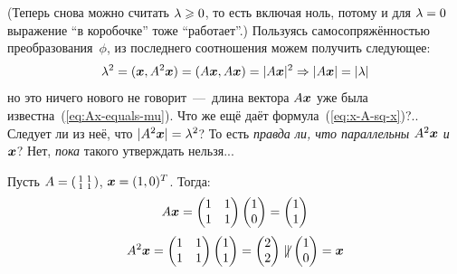\documentclass[a4paper,12pt]{article}
\makeatletter
\newcommand*{\Relbarfill@}{\arrowfill@\Relbar\Relbar\Relbar}
\newcommand*{\xeq}[2][]{\ext@arrow 0055\Relbarfill@{#1}{#2}}
\theoremstyle{remark}
\makeatother
\begin{document}
  (Теперь снова можно считать $\lambda \hm\geq 0$, то есть включая ноль, потому и для $\lambda \hm= 0$ выражение ``в коробочке'' тоже ``работает''.)
  Пользуясь самосопряжённостью преобразования~$\phi$, из последнего соотношения можем получить следующее:
  \[
    \lambda^2 = (\boldsymbol x, A^2 \boldsymbol x) = (A \boldsymbol x, A \boldsymbol x) = |A \boldsymbol x|^2 \Rightarrow |A \boldsymbol x| = |\lambda|
  \]
  но это ничего нового не говорит~---~длина вектора $A \boldsymbol x$ уже была известна~(\ref{eq:Ax-equals-mu}).
  Что же ещё даёт формула~(\ref{eq:x-A-sq-x})?..
  Следует ли из неё, что $|A^2 \bds x| \hm= \lambda^2$?
  То есть \emph{правда ли, что параллельны $A^2 \boldsymbol x$ и $\boldsymbol x$}?
  Нет, \emph{пока} такого утверждать нельзя...
  
  \begin{example}
    Пусть $A \hm= \left(\begin{smallmatrix}1 & 1 \\ 1 & 1\end{smallmatrix}\right)$, $\bds x \hm= (1, 0)^T$.
    Тогда:
    \[
      A \boldsymbol x = \begin{pmatrix}
        1 & 1\\
        1 & 1
      \end{pmatrix} \begin{pmatrix}
        1\\
        0
      \end{pmatrix} = \begin{pmatrix}
        1\\
        1
      \end{pmatrix}
    \]
    \[
      A^2 \boldsymbol x = \begin{pmatrix}
        1 & 1\\
        1 & 1
      \end{pmatrix} \begin{pmatrix}
        1\\
        1
      \end{pmatrix} = \begin{pmatrix}
        2\\
        2
      \end{pmatrix} \not\parallel \begin{pmatrix}
        1\\
        0
      \end{pmatrix} = \boldsymbol x
    \]
  \end{example}
  
\end{document}
